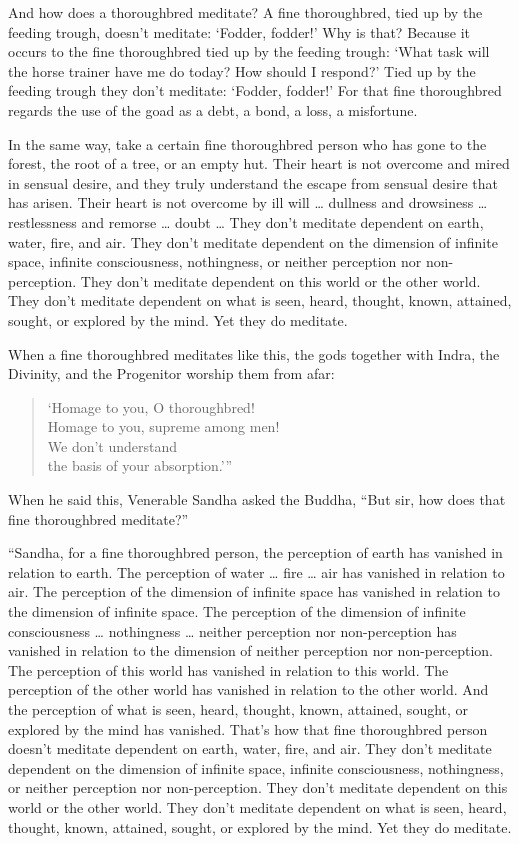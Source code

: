 \documentclass[12pt,openany]{book}%
\begin{document}
And how does a thoroughbred meditate? A fine thoroughbred, tied up by the feeding trough, doesn’t meditate: ‘Fodder, fodder!’ Why is that? Because it occurs to the fine thoroughbred tied up by the feeding trough: ‘What task will the horse trainer have me do today? How should I respond?’ Tied up by the feeding trough they don’t meditate: ‘Fodder, fodder!’ For that fine thoroughbred regards the use of the goad as a debt, a bond, a loss, a misfortune. 

In the same way, take a certain fine thoroughbred person who has gone to the forest, the root of a tree, or an empty hut. Their heart is not overcome and mired in sensual desire, and they truly understand the escape from sensual desire that has arisen. Their heart is not overcome by ill will … dullness and drowsiness … restlessness and remorse … doubt … They don’t meditate dependent on earth, water, fire, and air. They don’t meditate dependent on the dimension of infinite space, infinite consciousness, nothingness, or neither perception nor non-perception. They don’t meditate dependent on this world or the other world. They don’t meditate dependent on what is seen, heard, thought, known, attained, sought, or explored by the mind. Yet they do meditate. 

When a fine thoroughbred meditates like this, the gods together with Indra, the Divinity, and the Progenitor worship them from afar: 

\begin{verse}%
‘Homage to you, O thoroughbred! \\
Homage to you, supreme among men! \\
We don’t understand \\
the basis of your absorption.’” 

%
\end{verse}

When he said this, Venerable Sandha asked the Buddha, “But sir, how does that fine thoroughbred meditate?” 

“Sandha, for a fine thoroughbred person, the perception of earth has vanished in relation to earth. The perception of water … fire … air has vanished in relation to air. The perception of the dimension of infinite space has vanished in relation to the dimension of infinite space. The perception of the dimension of infinite consciousness … nothingness … neither perception nor non-perception has vanished in relation to the dimension of neither perception nor non-perception. The perception of this world has vanished in relation to this world. The perception of the other world has vanished in relation to the other world. And the perception of what is seen, heard, thought, known, attained, sought, or explored by the mind has vanished. That’s how that fine thoroughbred person doesn’t meditate dependent on earth, water, fire, and air. They don’t meditate dependent on the dimension of infinite space, infinite consciousness, nothingness, or neither perception nor non-perception. They don’t meditate dependent on this world or the other world. They don’t meditate dependent on what is seen, heard, thought, known, attained, sought, or explored by the mind. Yet they do meditate. 
\end{document}
